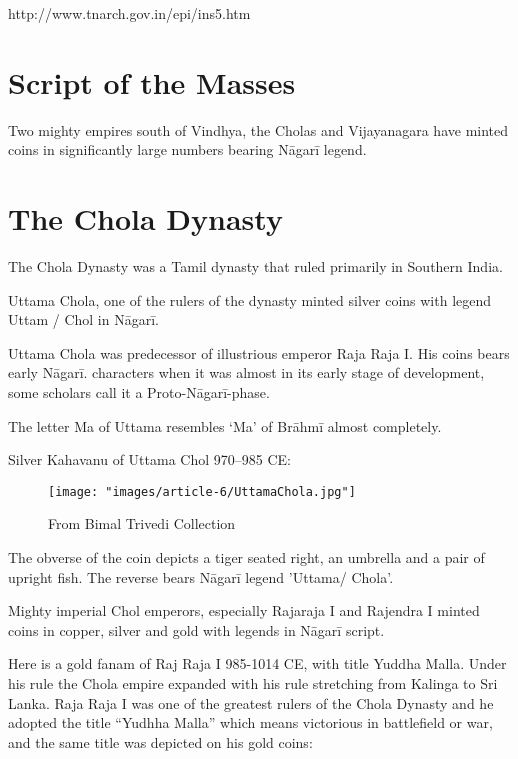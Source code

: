 http://www.tnarch.gov.in/epi/ins5.htm


\section*{Script of the Masses}

Two mighty empires south of Vindhya, the Cholas and Vijayanagara have minted coins in significantly large numbers bearing Nāgarī legend.


\section*{The Chola Dynasty}

The Chola Dynasty was a Tamil dynasty that ruled primarily in Southern India.

Uttama Chola, one of the rulers of the dynasty minted silver coins with legend Uttam / Chol in Nāgarī.

Uttama Chola was predecessor of illustrious emperor Raja Raja I. His coins bears early Nāgarī. characters when it was almost in its early stage of development, some scholars call it a Proto-Nāgarī-phase.

The letter Ma of Uttama resembles ‘Ma’ of Brāhmī almost completely.

Silver Kahavanu of Uttama Chol 970–985 CE:

\begin{figure}
\texttt{[image: "images/article-6/UttamaChola.jpg"]}
\caption{From Bimal Trivedi Collection}
\end{figure}

The obverse of the coin depicts a tiger seated right, an umbrella and a pair of upright fish. The reverse bears Nāgarī legend ’Uttama/ Chola’.

Mighty imperial Chol emperors, especially Rajaraja I and Rajendra I minted coins in copper, silver and gold with legends in Nāgarī script.

Here is a gold fanam of Raj Raja I 985-1014 CE, with title Yuddha Malla. Under his rule the Chola empire expanded with his rule stretching from Kalinga to Sri Lanka. Raja Raja I was one of the greatest rulers of the Chola Dynasty and he adopted the title “Yudhha Malla” which means victorious in battlefield or war, and the same title was depicted on his gold coins:


